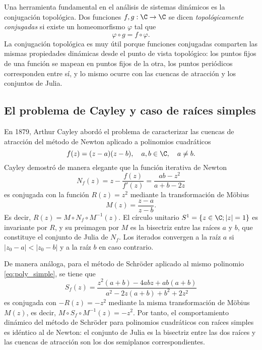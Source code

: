 Una herramienta fundamental en el análisis de sistemas dinámicos es la conjugación topológica. Dos funciones $f,g: \C \to \C$ se dicen \emph{topológicamente conjugadas} si existe un homeomorfismo $\varphi$ tal que
$$
\varphi\circ g=f\circ \varphi.
$$
La conjugación topológica es muy útil porque funciones conjugadas comparten las mismas propiedades dinámicas desde el punto de vista topológico: los puntos fijos de una función se mapean en puntos fijos de la otra, los puntos periódicos corresponden entre sí, y lo mismo ocurre con las cuencas de atracción y los conjuntos de Julia.

\subsection{El problema de Cayley y caso de raíces simples}

En 1879, Arthur Cayley \cite{Cay} abordó el problema de caracterizar las cuencas de atracción del método de Newton aplicado a polinomios cuadráticos
\begin{equation}
f(z)=(z-a)(z-b),\quad a,b\in \C, \quad a\ne b.
\label{eq:poly_simple}
\end{equation}
Cayley demostró de manera elegante que la función iterativa de Newton
\begin{equation}
 N_f(z)=z-\frac{f(z)}{f'(z)}=\frac{a b-z^2}{a+b-2 z}
 \label{eq:Newton_cuad}
\end{equation}
es conjugada con la función $R(z)=z^2$ mediante la transformación de Möbius
\begin{equation}
M(z)=\frac{z-a}{z-b}.
\label{eq:Mobius}
\end{equation}
Es decir, $R(z)=M\circ N_f\circ M^{-1}(z)$. El círculo unitario $S^1=\{z\in\C; |z|=1\}$ es invariante por $R$, y su preimagen por $M$ es la bisectriz entre las raíces $a$ y $b$, que constituye el conjunto de Julia de $N_f$. Los iterados convergen a la raíz $a$ si $|z_0-a|<|z_0-b|$ y a la raíz $b$ en caso contrario.

De manera análoga, para el método de Schröder aplicado al mismo polinomio \eqref{eq:poly_simple}, se tiene que
$$
S_f(z)=\frac{z^2 (a+b)-4 a b z+a b (a+b)}{a^2-2 z (a+b)+b^2+2 z^2}
$$
es conjugada con $-R(z)=-z^2$ mediante la misma transformación de Möbius $M(z)$, es decir, $M\circ S_f\circ M^{-1}(z)=-z^2$. Por tanto, el comportamiento dinámico del método de Schröder para polinomios cuadráticos con raíces simples es idéntico al de Newton: el conjunto de Julia es la bisectriz entre las dos raíces y las cuencas de atracción son los dos semiplanos correspondientes.

